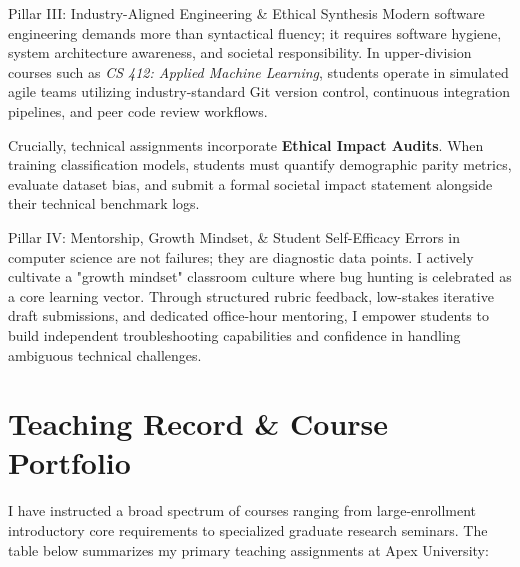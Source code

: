 \documentclass[11pt,a4paper]{article}
\begin{document}
\vspace{2pt}

\begin{pillarbox}{Pillar III: Industry-Aligned Engineering \& Ethical Synthesis}
  Modern software engineering demands more than syntactical fluency; it requires software hygiene, system architecture awareness, and societal responsibility. In upper-division courses such as \textit{CS 412: Applied Machine Learning}, students operate in simulated agile teams utilizing industry-standard Git version control, continuous integration pipelines, and peer code review workflows.
  
  Crucially, technical assignments incorporate \textbf{Ethical Impact Audits}. When training classification models, students must quantify demographic parity metrics, evaluate dataset bias, and submit a formal societal impact statement alongside their technical benchmark logs.
\end{pillarbox}

\vspace{2pt}

\begin{pillarbox}{Pillar IV: Mentorship, Growth Mindset, \& Student Self-Efficacy}
  Errors in computer science are not failures; they are diagnostic data points. I actively cultivate a "growth mindset" classroom culture where bug hunting is celebrated as a core learning vector. Through structured rubric feedback, low-stakes iterative draft submissions, and dedicated office-hour mentoring, I empower students to build independent troubleshooting capabilities and confidence in handling ambiguous technical challenges.
\end{pillarbox}

\vspace{4pt}

\section{Teaching Record \& Course Portfolio}

I have instructed a broad spectrum of courses ranging from large-enrollment introductory core requirements to specialized graduate research seminars. The table below summarizes my primary teaching assignments at Apex University:

\vspace{2pt}
\end{document}
